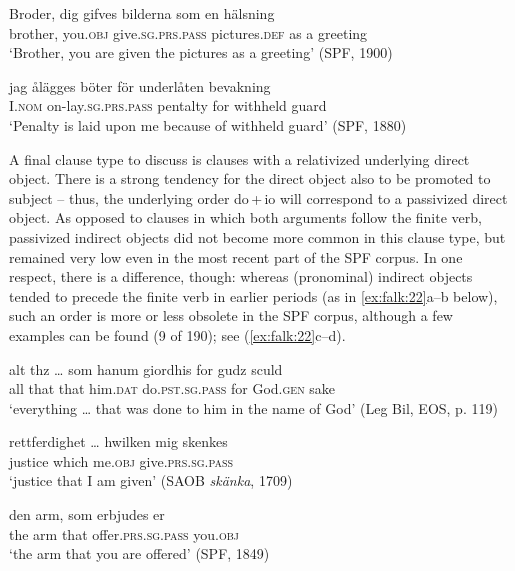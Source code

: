 \documentclass[output=paper]{langscibook}
\begin{document}
\ea%
    \label{ex:falk:21}
\ea \label{ex:falk:21a}
\gll Broder,  dig    gifves            bilderna      som  en  hälsning\\
      brother,  you.\textsc{obj}  give.\textsc{sg.prs.pass}  pictures\textsc{.def}  as    a  greeting\\
\glt ‘Brother, you are given the pictures as a greeting’ (SPF, 1900)

\ex \label{ex:falk:21b}
\gll jag      ålägges          böter      för    underlåten  bevakning\\
      I.\textsc{nom}  on-lay.\textsc{sg.prs.pass}  pentalty  for    withheld   guard\\
\glt ‘Penalty is laid upon me because of withheld guard’ (SPF, 1880)
\z
\z

A final clause type to discuss is clauses with a relativized underlying direct object. There is a strong tendency for the direct object also to be promoted to subject – thus, the underlying order do\,+\,io will correspond to a passivized direct object. As opposed to clauses in which both arguments follow the finite verb, passivized indirect objects did not become more common in this clause type, but remained very low even in the most recent part of the SPF corpus. In one respect, there is a difference, though: whereas (pronominal) indirect objects tended to precede the finite verb in earlier periods (as in \ref{ex:falk:22}a–b below), such an order is more or less obsolete in the SPF corpus, although a few examples can be found (9 of 190); see (\ref{ex:falk:22}c–d).


\ea%
    \label{ex:falk:22}
\ea\label{ex:falk:22a}
\gll alt  thz …    som  hanum    giordhis          for    gudz      sculd\\
      all  that {}  that  him\textsc{.dat}    do\textsc{.pst.sg.pass}  for    God.\textsc{gen}  sake\\
\glt ‘everything … that was done to him in the name of God’ (Leg Bil, EOS, p. 119)

\ex\label{ex:falk:22b}
\gll rettferdighet … hwilken  mig    skenkes\\
      justice {}      which    me\textsc{.obj}   give\textsc{.prs.sg.pass}\\
\glt ‘justice that I am given’ (SAOB \textit{skänka}, 1709)

\ex\label{ex:falk:22c}
\gll den  arm,  som  erbjudes            er\\
      the  arm  that  offer\textsc{.prs.sg.pass}     you.\textsc{obj}\\
\glt ‘the arm that you are offered’ (SPF, 1849)
\end{document}
